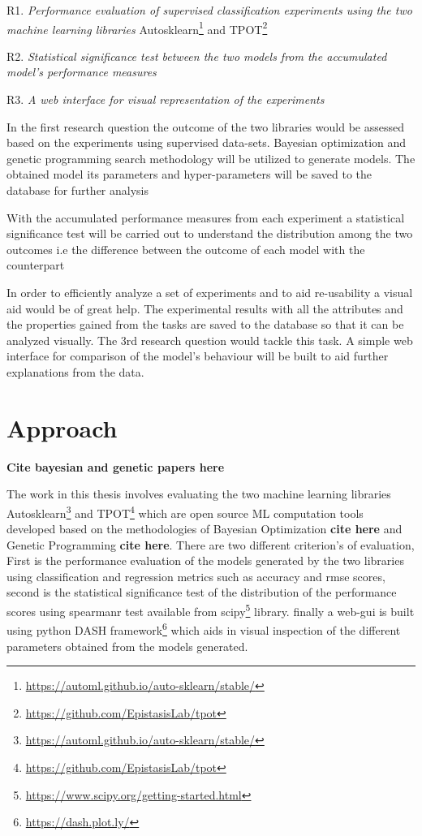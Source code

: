R1.\label{point:R1} \textit{Performance evaluation of supervised classification experiments using the two machine learning libraries} Autosklearn\footnote{\url{https://automl.github.io/auto-sklearn/stable/}} and TPOT\footnote{\url{https://github.com/EpistasisLab/tpot}}

R2.\label{point:R2} \textit{Statistical significance test between the two models from the accumulated model's performance measures}

R3.\label{point:R3} \textit{A web interface for visual representation of the experiments}

In the first research question the outcome of the two libraries would be assessed based on the experiments using supervised data-sets. Bayesian optimization and genetic programming search methodology will be utilized to generate models. The obtained model its parameters and hyper-parameters will be saved to the database for further analysis

With the accumulated performance measures from each experiment a statistical significance test will be carried out to understand the distribution among the two outcomes i.e the difference between the outcome of each model with the counterpart

In order to efficiently analyze a set of experiments and to aid re-usability a visual aid would be of great help. The experimental results with all the attributes and the properties gained from the tasks are saved to the database so that it can be analyzed visually. The 3rd research question would tackle this task. A simple web interface for comparison of the model's behaviour will be built to aid further explanations from the data.

\section{Approach}
\textbf{Cite bayesian and genetic papers here}


The work in this thesis involves evaluating the two machine learning libraries Autosklearn\footnote{\url{https://automl.github.io/auto-sklearn/stable/}} and TPOT\footnote{\url{https://github.com/EpistasisLab/tpot}} which are open source ML computation tools developed based on the methodologies of Bayesian Optimization \textbf{cite here} and Genetic Programming \textbf{cite here}. There are two different criterion's of evaluation, First is the performance evaluation of the models generated by the two libraries using classification and regression metrics such as accuracy and rmse scores, second is the statistical significance test of the distribution of the performance scores using spearmanr test available from scipy\footnote{\url{https://www.scipy.org/getting-started.html}} library. finally a web-gui is built using python DASH framework\footnote{\url{https://dash.plot.ly/}} which aids in visual inspection of the different parameters obtained from the models generated.

